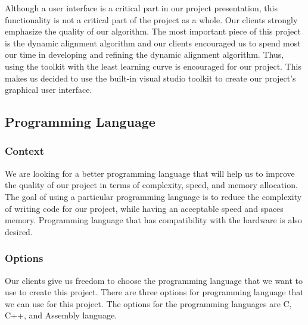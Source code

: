 Although a user interface is a critical part in our project presentation, this functionality is not a critical part of the project as a whole. Our clients strongly emphasize the quality of our algorithm. The most important piece of this project is the dynamic alignment algorithm and our clients encouraged us to spend most our time in developing and refining the dynamic alignment algorithm. Thus, using the toolkit with the least learning curve is encouraged for our project. This makes us decided to use the built-in visual studio toolkit to create our project’s graphical user interface. 



\subsection{Programming Language}
\subsubsection{Context}
We are looking for a better programming language that will help us to improve the quality of our project in terms of complexity, speed, and memory allocation. The goal of using a particular programming language is to reduce the complexity of writing code for our project, while having an acceptable speed and spaces memory. Programming language that has compatibility with the hardware is also desired.\\

\subsubsection{Options}
Our clients give us freedom to choose the programming language that we want to use to create this project. There are three options for programming language that we can use for this project. The options for the programming languages are C, C++, and Assembly language.\\

